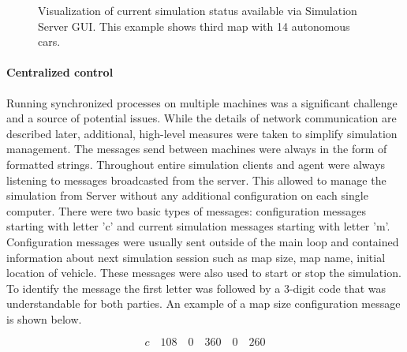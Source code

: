 \documentclass[11pt,english,twoside]{article}
\begin{document}
\begin{figure}[!] %
\caption{Visualization of current simulation status available via Simulation Server GUI. This example shows third map with 14 autonomous cars.}
\label{fig:master_gui_small}
\end{figure} 



\paragraph{Centralized control}


Running synchronized processes on multiple machines was a significant challenge and a source of potential issues. While the details of network communication are described later, additional, high-level measures were taken to simplify simulation management. The messages send between machines were always in the form of formatted strings. Throughout entire simulation clients and agent were always listening to messages broadcasted from the server. This allowed to manage the simulation from Server without any additional configuration on each single computer. There were two basic types of messages: configuration messages starting with letter 'c' and current simulation messages starting with letter 'm'.
Configuration messages were usually sent outside of the main loop and contained information about next simulation session such as map size, map name, initial location of vehicle. These messages were also used to start or stop the simulation. To identify the message the first letter was followed by a 3-digit code that was understandable for both parties. An example of a map size configuration message is shown below.

\begin{equation}
c \quad 108 \quad 0 \quad 360 \quad 0 \quad 260
\end{equation}
\end{document}

